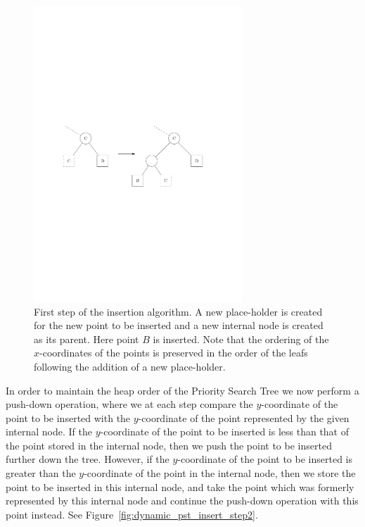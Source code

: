 \documentclass[twoside,11pt,openright]{report}
\begin{document}
\begin{figure}[b]
	\centering
		\includegraphics[width=0.7\textwidth]{../figures/internal_pst_insert_step1}
	\caption{First step of the insertion algorithm. A new place-holder is created for the new point to be inserted and a new internal node is created as its parent. Here point $B$ is inserted. Note that the ordering of the $x$-coordinates of the points is preserved in the order of the leafs following the addition of a new place-holder.}
	\label{fig:dynamic_pst_insert_step1}
\end{figure}


In order to maintain the heap order of the Priority Search Tree we now perform a push-down operation, where we at each step compare the $y$-coordinate of the point to be inserted with the $y$-coordinate of the point represented by the given internal node. If the $y$-coordinate of the point to be inserted is less than that of the point stored in the internal node, then we push the point to be inserted further down the tree. However, if the $y$-coordinate of the point to be inserted is greater than the $y$-coordinate of the point in the internal node, then we store the point to be inserted in this internal node, and take the point which was formerly represented by this internal node and continue the push-down operation with this point instead. See Figure~\ref{fig:dynamic_pst_insert_step2}.
\end{document}
